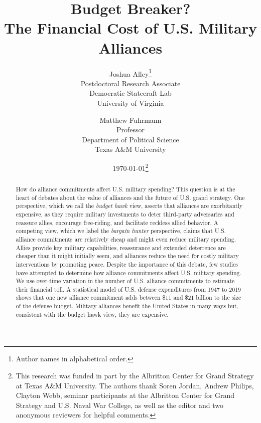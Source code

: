 \documentclass[12pt,hidelinks]{article}
\begin{document}
\singlespace

\title{\textbf{\huge Budget Breaker?}\\\Large \textbf{The Financial Cost of U.S. Military Alliances}}


\author{Joshua Alley\thanks{Author names in alphabetical order.} \\
Postdoctoral Research Associate\\
Democratic Statecraft Lab\\
University of Virginia  \\
\and
Matthew Fuhrmann\\
Professor\\
Department of Political Science\\
Texas A\&M University}

 
\date{\today\thanks{This research was funded in part by the Albritton Center for Grand Strategy at Texas A\&M University. The authors thank Soren Jordan, Andrew Philips, Clayton Webb, seminar participants at the Albritton Center for Grand Strategy and U.S. Naval War College, as well as the editor and two anonymous reviewers for helpful comments. }}


\maketitle 



\begin{abstract}
\noindent How do alliance commitments affect U.S. military spending? 
This question is at the heart of debates about the value of alliances and the future of U.S. grand strategy.
One perspective, which we call the \textit{budget hawk} view, asserts that alliances are exorbitantly expensive, as they require military investments to deter third-party adversaries and reassure allies, encourage free-riding, and facilitate reckless allied behavior.
A competing view, which we label the \textit{bargain hunter} perspective, claims that U.S. alliance commitments are relatively cheap and might even reduce military spending.
Allies provide key military capabilities, reassurance and extended deterrence are cheaper than it might initially seem, and alliances reduce the need for costly military interventions by promoting peace. 
Despite the importance of this debate, few studies have attempted to determine how alliance commitments affect U.S. military spending.
We use over-time variation in the number of U.S. alliance commitments to estimate their financial toll.
A statistical model of U.S. defense expenditures from 1947 to 2019 shows that one new alliance commitment adds between \$11 and \$21 billion to the size of the defense budget. 
Military alliances benefit the United States in many ways but, consistent with the budget hawk view, they are expensive.
\end{abstract}
\end{document}
